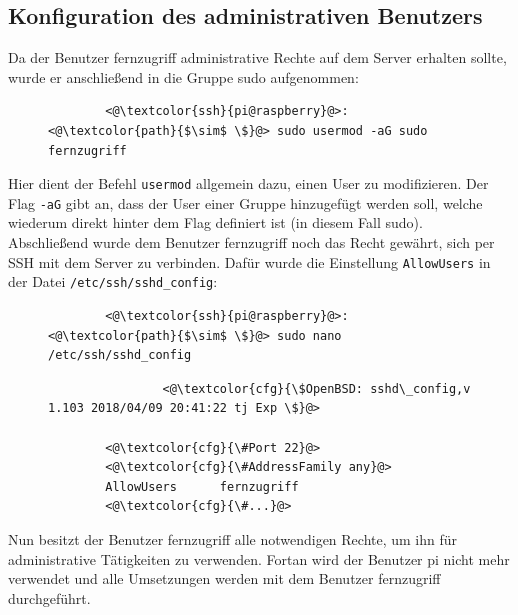\documentclass[a4paper, 11pt]{scrartcl}
\begin{document}
\subsection{Konfiguration des administrativen Benutzers}\label{ch:user_admincfg}
Da der Benutzer \glqq fernzugriff\grqq{} administrative Rechte auf dem Server erhalten sollte, wurde er anschließend in die Gruppe \glqq sudo\grqq{} aufgenommen:
\begin{figure}[H]
    \begin{mdframed}[backgroundcolor=bbg]
        \begin{lstlisting}
        <@\textcolor{ssh}{pi@raspberry}@>:<@\textcolor{path}{$\sim$ \$}@> sudo usermod -aG sudo fernzugriff
        \end{lstlisting}
    \end{mdframed}
    \label{lst:usermod_fernzugriff}
\end{figure}
Hier dient der Befehl \lstinline[basicstyle={\small\ttfamily\color{black}}]|usermod| allgemein dazu, einen User zu modifizieren. Der Flag \lstinline[basicstyle={\small\ttfamily\color{black}}]|-aG| gibt an,
dass der User einer Gruppe hinzugefügt werden soll, welche wiederum direkt hinter dem Flag definiert ist (in diesem Fall \glqq sudo\grqq).
\\
Abschließend wurde dem Benutzer \glqq fernzugriff\grqq{} noch das Recht gewährt, sich per SSH mit dem Server zu verbinden. Dafür wurde die Einstellung \lstinline[basicstyle={\small\ttfamily\color{black}}]|AllowUsers|
in der Datei \lstinline[basicstyle={\small\ttfamily\color{black}}]|/etc/ssh/sshd_config|:

\begin{figure}[H]
    \begin{mdframed}[backgroundcolor=bbg]
        \begin{lstlisting}
        <@\textcolor{ssh}{pi@raspberry}@>:<@\textcolor{path}{$\sim$ \$}@> sudo nano /etc/ssh/sshd_config
        \end{lstlisting}
    \end{mdframed}
    \label{lst:nano_sshd_config}
\end{figure}
\begin{figure}[H]
    \begin{mdframed}[backgroundcolor=bbg]
        \begin{lstlisting}
                <@\textcolor{cfg}{\$OpenBSD: sshd\_config,v 1.103 2018/04/09 20:41:22 tj Exp \$}@>    

        <@\textcolor{cfg}{\#Port 22}@>
        <@\textcolor{cfg}{\#AddressFamily any}@>
        AllowUsers      fernzugriff
        <@\textcolor{cfg}{\#...}@>
        \end{lstlisting}
    \end{mdframed}
    \label{lst:fernzugriff_ssh}
\end{figure}
Nun besitzt der Benutzer \glqq fernzugriff\grqq{} alle notwendigen Rechte, um ihn für administrative Tätigkeiten zu verwenden. Fortan wird der Benutzer \glqq pi\grqq{} nicht mehr verwendet und alle
Umsetzungen werden mit dem Benutzer \glqq fernzugriff\grqq{} durchgeführt.
\end{document}
